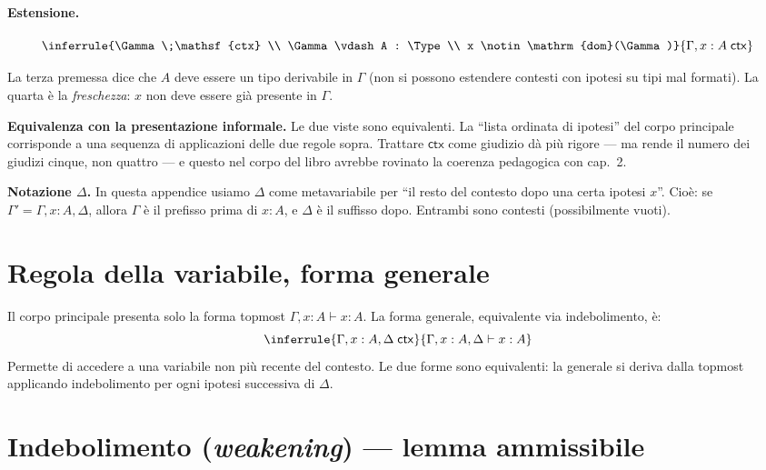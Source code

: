 \paragraph{Estensione.}
\[
\inferrule{\Gamma \;\mathsf{ctx} \\ \Gamma \vdash A : \Type \\ x \notin \mathrm{dom}(\Gamma)}{\Gamma, x : A \;\mathsf{ctx}}
\]

\noindent La terza premessa dice che $A$ deve essere un tipo derivabile in $\Gamma$ (non si possono estendere contesti con ipotesi su tipi mal formati). La quarta \`e la \emph{freschezza}: $x$ non deve essere gi\`a presente in $\Gamma$.

\bigskip

\noindent\textbf{Equivalenza con la presentazione informale.} Le due viste sono equivalenti. La ``lista ordinata di ipotesi'' del corpo principale corrisponde a una sequenza di applicazioni delle due regole sopra. Trattare $\mathsf{ctx}$ come giudizio d\`a pi\`u rigore --- ma rende il numero dei giudizi cinque, non quattro --- e questo nel corpo del libro avrebbe rovinato la coerenza pedagogica con cap.~2.

\bigskip

\noindent\textbf{Notazione $\Delta$.} In questa appendice usiamo $\Delta$ come metavariabile per ``il resto del contesto dopo una certa ipotesi $x$''. Cio\`e: se $\Gamma' = \Gamma, x : A, \Delta$, allora $\Gamma$ \`e il prefisso prima di $x : A$, e $\Delta$ \`e il suffisso dopo. Entrambi sono contesti (possibilmente vuoti).

\section*{Regola della variabile, forma generale}

Il corpo principale presenta solo la forma topmost $\Gamma, x : A \vdash x : A$. La forma generale, equivalente via indebolimento, \`e:
\[
\inferrule{\Gamma, x : A, \Delta \;\mathsf{ctx}}{\Gamma, x : A, \Delta \vdash x : A}
\]
Permette di accedere a una variabile non pi\`u recente del contesto. Le due forme sono equivalenti: la generale si deriva dalla topmost applicando indebolimento per ogni ipotesi successiva di $\Delta$.

\section*{Indebolimento (\emph{weakening}) --- lemma ammissibile}

